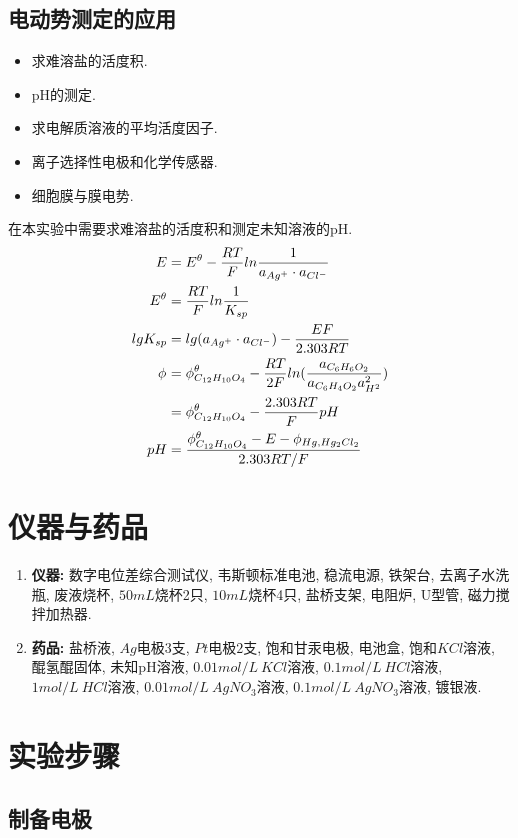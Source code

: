 \documentclass[a4paper]{article}
\begin{document}
\subsection{电动势测定的应用}
\begin{itemize}
	\item 求难溶盐的活度积.
	\item pH的测定.
	\item 求电解质溶液的平均活度因子.
	\item 离子选择性电极和化学传感器.
	\item 细胞膜与膜电势.
\end{itemize}
在本实验中需要求难溶盐的活度积和测定未知溶液的pH.
\begin{equation}
	\centering
	\begin{aligned}
		E &= E^{\theta} - \frac{RT}{F}ln\frac{1}{a_{Ag^{+}}\cdot a_{Cl^{-}}}\\
		E^{\theta} &= \frac{RT}{F}ln\frac{1}{K_{sp}}\\
		lgK_{sp} &= lg(a_{Ag^{+}}\cdot a_{Cl^{-}}) - \frac{EF}{2.303RT}\\
		\phi_{} &= \phi_{C_{12}H_{10}O_{4}}^{\theta} - \frac{RT}{2F}ln(\frac{a_{C_{6}H_{6}O_{2}}}{a_{C_{6}H_{4}O_{2}}a_{H^{2}}^{2}})\\
			& = \phi_{C_{12}H_{10}O_{4}}^{\theta} - \frac{2.303RT}{F}pH\\
		pH &= \frac{\phi_{C_{12}H_{10}O_{4}}^{\theta}-E-\phi_{Hg,Hg_{2}Cl_{2}}}{2.303RT/F}
	\end{aligned}
\end{equation}
\section{仪器与药品}
\begin{enumerate}
    \item \textbf{仪器:} 数字电位差综合测试仪, 韦斯顿标准电池, 稳流电源, 铁架台, 去离子水洗瓶, 废液烧杯, 
    $50mL$烧杯2只, $10mL$烧杯4只, 盐桥支架, 电阻炉, U型管, 磁力搅拌加热器.
    \item \textbf{药品:} 盐桥液, $Ag$电极$3$支, $Pt$电极$2$支, 饱和甘汞电极, 电池盒, 
	饱和$KCl$溶液, 醌氢醌固体, 未知pH溶液, $0.01mol/L~KCl$溶液, $0.1mol/L~HCl$溶液, 
	$1mol/L~HCl$溶液, $0.01mol/L~AgNO_{3}$溶液, $0.1mol/L~AgNO_{3}$溶液, 镀银液.
\end{enumerate}
\section{实验步骤}
\subsection{制备电极}
\end{document}
